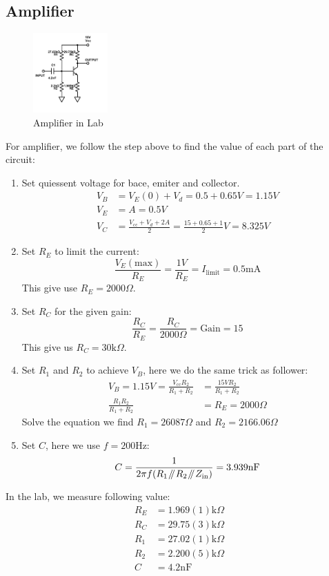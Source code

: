 \documentclass[aps,prl,reprint]{revtex4-1}
\newcommand{\vcc}{V_\text{cc}}
\newcommand{\parallelsum}{\mathbin{\!/\mkern-5mu/\!}}
\begin{document}
\subsection{Amplifier}
\begin{figure}[h]
    \centering
    \includegraphics[height=1.2in]{image/Common-Emitter-Amplifier-Full-Lab.pdf}
    \caption{Amplifier in Lab}
    \label{fig:amplifierLab}
\end{figure}
For amplifier, we follow the step above to find the value of each part of the circuit:
\begin{enumerate}
    \item Set quiessent voltage for bace, emiter and collector. 
    \begin{align*}
        V_B &= V_E(0) + V_d = 0.5 + 0.65V = 1.15V \\
        V_E &= A = 0.5V \\
        V_C &= \frac{\vcc + V_d + 2 A}{2} = \frac{15+0.65+1}{2}V=8.325V
    \end{align*}
    \item Set $R_E$ to limit the current:
    \[
    \frac{V_E(\text{max})}{R_E} = \frac{1V}{R_E}= I_\text{limit} = 0.5\text{mA}
    \]
    This give use $R_E = 2000\Omega$.
    \item Set $R_C$ for the given gain:
    \[
    \frac{R_C}{R_E} = \frac{R_C}{2000\Omega} =  \text{Gain} = 15
    \]
    This give us $R_C = 30\text{k}\Omega$.
    \item Set $R_1$ and $R_2$ to achieve $V_B$, here we do the same trick as follower:
    \begin{align*}
        V_B = 1.15V = \frac{\vcc R_2}{R_1 + R_2} &= \frac{15V R_2}{R_1 + R_2}\\
        \frac{R_1R_2}{R_1 + R_2} &= R_E = 2000\Omega
    \end{align*}
    Solve the equation we find $R_1 = 26087\Omega$ and $R_2 = 2166.06\Omega$
    \item Set $C$, here we use $f = 200$Hz:
    \[
    C = \frac{1}{2\pi f (R_1 \parallelsum R_2 \parallelsum Z_\text{in})} = 3.939\text{nF}
    \]
\end{enumerate}
    
    In the lab, we measure following value:
    \begin{align*}
        R_E &= 1.969(1)\text{k}\Omega\\
        R_C &= 29.75(3)\text{k}\Omega\\
        R_1 &= 27.02(1)\text{k}\Omega\\
        R_2 &= 2.200(5)\text{k}\Omega\\
        C &= 4.2\text{nF}
    \end{align*}
\end{document}
